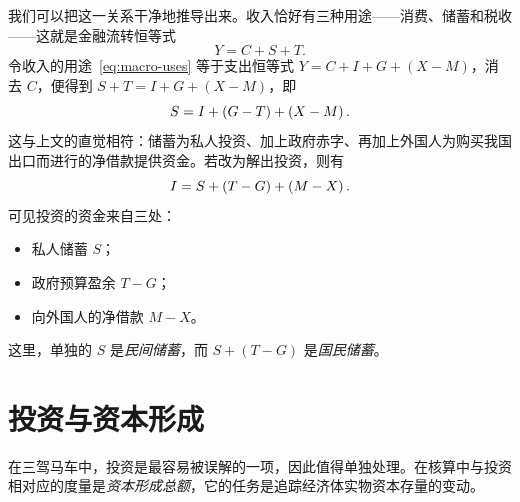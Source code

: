 我们可以把这一关系干净地推导出来。收入恰好有三种用途——消费、储蓄和税收——这就是金融流转恒等式
\begin{equation}
Y = C + S + T.
\label{eq:macro-uses}
\end{equation}
令收入的用途~\eqref{eq:macro-uses} 等于支出恒等式 $Y = C + I + G + (X-M)$，消去 $C$，便得到 $S + T = I + G + (X-M)$，即
\begin{equation}
S = I + \left(G - T\right) + \left(X - M\right).
\label{eq:macro-saving}
\end{equation}
这与上文的直觉相符：储蓄为私人投资、加上政府赤字、再加上外国人为购买我国出口而进行的净借款提供资金。若改为解出投资，则有
\begin{equation}
I = S + \left(T - G\right) + \left(M - X\right).
\label{eq:macro-investment}
\end{equation}
可见投资的资金来自三处：
\begin{itemize}
    \item 私人储蓄 $S$；
    \item 政府预算盈余 $T - G$；
    \item 向外国人的净借款 $M - X$。
\end{itemize}
这里，单独的 $S$ 是\emph{民间储蓄}，而 $S + (T-G)$ 是\emph{国民储蓄}。



\section{投资与资本形成}

在三驾马车中，投资是最容易被误解的一项，因此值得单独处理。在核算中与投资相对应的度量是\emph{资本形成总额}，它的任务是追踪经济体实物资本存量的变动。

